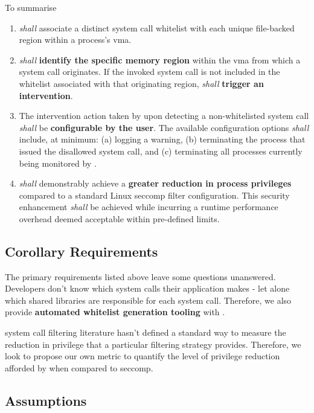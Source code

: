 To summarise 

\begin{enumerate}
    \item \af \textit{shall} associate a distinct system call whitelist with each unique file-backed region within a process's \ac{vma}.
    \item \af \textit{shall} \textbf{identify the specific memory region} within the \ac{vma} from which a system call originates. If the invoked system call is not included in the whitelist associated with that originating region, \af \textit{shall} \textbf{trigger an intervention}.
    \item The intervention action taken by \af upon detecting a non-whitelisted system call \textit{shall} be \textbf{configurable by the user}. The available configuration options \textit{shall} include, at minimum: (a) logging a warning, (b) terminating the process that issued the disallowed system call, and (c) terminating all processes currently being monitored by \af.
    \item \af \textit{shall} demonstrably achieve a \textbf{greater reduction in process privileges} compared to a standard Linux seccomp filter configuration. This security enhancement \textit{shall} be achieved while incurring a runtime performance overhead deemed acceptable within pre-defined limits.
\end{enumerate}

\subsection{Corollary Requirements} \label{subsubsec:corollary-reqs}

The primary requirements listed above leave some questions unanswered.
Developers don't know which system calls their application makes - let alone
which shared libraries are responsible for each system call. Therefore, we also
provide \textbf{automated whitelist generation tooling} with \af. 

system call filtering literature hasn't defined a standard way to measure the
reduction in privilege that a particular filtering strategy provides. Therefore,
we look to propose our own metric to quantify the level of privilege reduction
afforded by \af when compared to seccomp.

\subsection{Assumptions}\label{subsec:assumptions}

